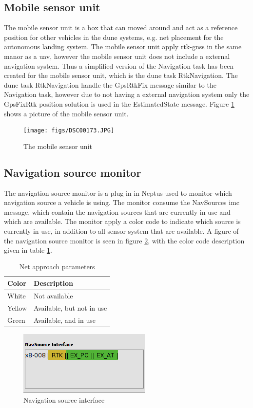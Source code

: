 \subsection{Mobile sensor unit}\label{ss:MobileSensor}
The mobile sensor unit is a box that can moved around and act as a reference position for other vehicles in the \gls{dune} systems, e.g. net placement for the autonomous landing system. The mobile sensor unit apply \gls{rtk-gnss} in the same manor as a \gls{uav}, however the mobile sensor unit does not include a external navigation system. Thus a simplified version of the Navigation task has been created for the mobile sensor unit, which is the \gls{dune} task RtkNavigation. The \gls{dune} task RtkNavigation handle the GpsRtkFix message similar to the Navigation task, however due to not having a external navigation system only the GpsFixRtk position solution is used in the EstimatedState message. Figure \ref{Fig:MobileSensor} shows a picture of the mobile sensor unit.
\begin{figure}[H]
\centering
\texttt{[image: figs/DSC00173.JPG]}
\caption{The mobile sensor unit}
\label{Fig:MobileSensor}
\end{figure}
\subsection{Navigation source monitor}
The navigation source monitor is a plug-in in Neptus used to monitor which navigation source a vehicle is using. The monitor consume the NavSources \gls{imc} message, which contain the navigation sources that are currently in use and which are available. The monitor apply a color code to indicate which source is currently in use, in addition to all sensor system that are available. A figure of the navigation source monitor is seen in figure \ref{Fig:NavsourceInterface}, with the color code description given in table \ref{Tb:Color Code}.
\begin{table}[H]
\begin{center}
    \begin{tabular}{ | l | l |}
    \hline
    \textbf{Color} & \textbf{Description} \\ \hline
    White & Not available \\ \hline
    Yellow & Available, but not in use \\ \hline
    Green & Available, and in use \\ \hline
    \end{tabular}
\end{center}
\caption{Net approach parameters }
\label{Tb:Color Code}
\end{table}
\begin{figure}[H]
\centering
\includegraphics[scale=0.6]{figs/NavSourceInterface.png}
\caption{Navigation source interface}
\label{Fig:NavsourceInterface}
\end{figure}
